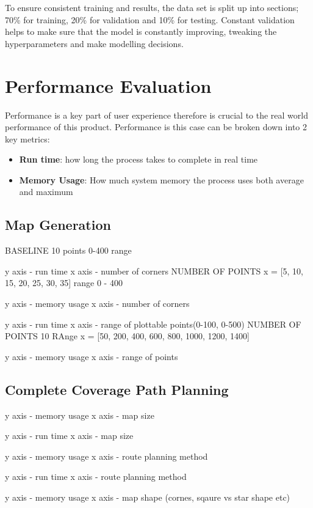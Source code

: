 \documentclass[final]{cmpreport_02}
\begin{document}
To ensure consistent training and results, the data set is split up into sections; 70\% for training, 20\% for validation and 10\% for testing.
Constant validation helps to make sure that the model is constantly improving, tweaking the hyperparameters and make modelling decisions.
\section{Performance Evaluation}
Performance is a key part of user experience therefore is crucial to the real world performance of this product.
Performance is this case can be broken down into 2 key metrics:

\begin{itemize}
    \item{\textbf{Run time}: how long the process takes to complete in real time}
    \item{\textbf{Memory Usage}: How much system memory the process uses both average and maximum}
\end{itemize}

\subsection{Map Generation}
BASELINE
10 points 0-400 range

y axis - run time
x axis - number of corners
NUMBER OF POINTS x = [5, 10, 15, 20, 25, 30, 35]
range 0 - 400

y axis - memory usage
x axis - number of corners

y axis - run time
x axis - range of plottable points(0-100, 0-500)
NUMBER OF POINTS 10
    RAnge x = [50, 200, 400, 600, 800, 1000, 1200, 1400]

y axis - memory usage
x axis - range of points

\subsection{Complete Coverage Path Planning}

y axis - memory usage
x axis - map size

y axis - run time
x axis - map size

y axis - memory usage
x axis - route planning method

y axis - run time
x axis - route planning method

y axis - memory usage
x axis - map shape (cornes, sqaure vs star shape etc)
\end{document}
